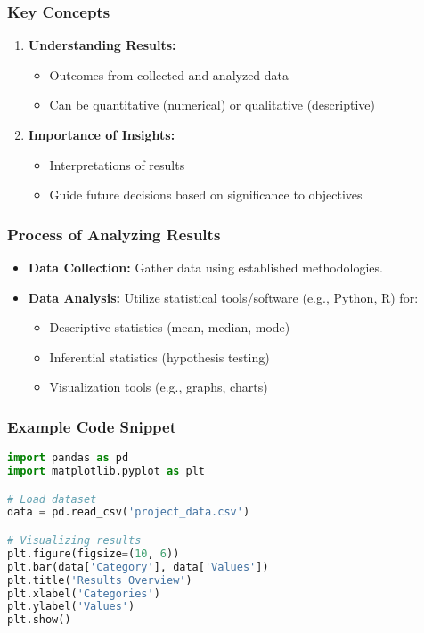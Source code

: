\documentclass[aspectratio=169]{beamer}
\begin{document}
\begin{frame}
    \frametitle{Key Concepts}
    \begin{enumerate}
        \item \textbf{Understanding Results:}
        \begin{itemize}
            \item Outcomes from collected and analyzed data
            \item Can be quantitative (numerical) or qualitative (descriptive)
        \end{itemize}

        \item \textbf{Importance of Insights:}
        \begin{itemize}
            \item Interpretations of results
            \item Guide future decisions based on significance to objectives
        \end{itemize}
    \end{enumerate}
\end{frame}

\begin{frame}
    \frametitle{Process of Analyzing Results}
    \begin{itemize}
        \item \textbf{Data Collection:} Gather data using established methodologies.
        \item \textbf{Data Analysis:} Utilize statistical tools/software (e.g., Python, R) for:
        \begin{itemize}
            \item Descriptive statistics (mean, median, mode)
            \item Inferential statistics (hypothesis testing)
            \item Visualization tools (e.g., graphs, charts)
        \end{itemize}
    \end{itemize}
\end{frame}

\begin{frame}[fragile]
    \frametitle{Example Code Snippet}
    \begin{lstlisting}[language=Python]
import pandas as pd
import matplotlib.pyplot as plt

# Load dataset
data = pd.read_csv('project_data.csv')

# Visualizing results
plt.figure(figsize=(10, 6))
plt.bar(data['Category'], data['Values'])
plt.title('Results Overview')
plt.xlabel('Categories')
plt.ylabel('Values')
plt.show()
    \end{lstlisting}
\end{frame}
\end{document}

